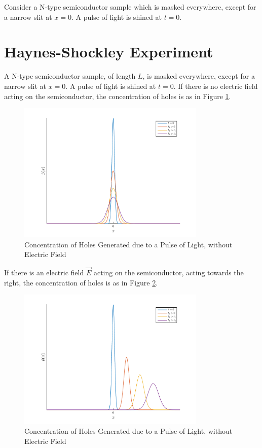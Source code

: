 \documentclass[titlepage, fleqn, a4paper, 12pt, twoside]{article}
\theoremstyle{definition}
\theoremstyle{theorem}
\let\Oldsection\section
\renewcommand{\section}{\FloatBarrier\Oldsection}
\begin{document}
	Consider a N-type semiconductor sample which is masked everywhere, except for a narrow slit at $x = 0$.
	A pulse of light is shined at $t = 0$.

\section{Haynes-Shockley Experiment}

A N-type semiconductor sample, of length $L$, is masked everywhere, except for a narrow slit at $x = 0$.
A pulse of light is shined at $t = 0$.
If there is no electric field acting on the semiconductor, the concentration of holes is as in Figure \ref{fig:Concentration_of_Holes_Generated_due_to_a_Pulse_of_Light_without_Electric_Field}.
\begin{figure}[h]
	\centering
	\includegraphics[width = 0.8\textwidth]{fig-pulse_of_light_without_electric_field.pdf}
	\caption{Concentration of Holes Generated due to a Pulse of Light, without Electric Field}
	\label{fig:Concentration_of_Holes_Generated_due_to_a_Pulse_of_Light_without_Electric_Field}
\end{figure}
If there is an electric field $\overrightarrow{E}$ acting on the semiconductor, acting towards the right, the concentration of holes is as in Figure \ref{fig:Concentration_of_Holes_Generated_due_to_a_Pulse_of_Light_with_Electric_Field}.
\begin{figure}[h]
	\centering
	\includegraphics[width = 0.8\textwidth]{fig-pulse_of_light_with_electric_field.pdf}
	\caption{Concentration of Holes Generated due to a Pulse of Light, without Electric Field}
	\label{fig:Concentration_of_Holes_Generated_due_to_a_Pulse_of_Light_with_Electric_Field}
\end{figure}
\end{document}
